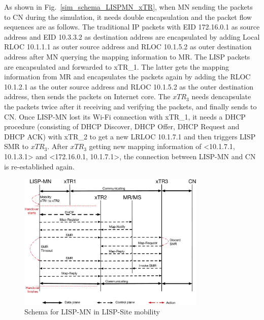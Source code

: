 As shown in Fig.~\ref{sim_schema_LISPMN_xTR}, when MN sending the packets to CN during the simulation, it needs double encapsulation and the packet flow sequences are as follows. The traditional IP packets with EID 172.16.0.1 as source address and EID 10.3.3.2 as destination address are encapsulated by adding Local RLOC 10.1.1.1 as outer source address and RLOC 10.1.5.2 as outer destination address after MN querying the mapping information to MR. The LISP packets are encapsulated and forwarded to xTR\_1. The latter gets the mapping information from MR and encapsulates the packets again by adding the RLOC 10.1.2.1 as the outer source address and RLOC 10.1.5.2 as the outer destination address, then sends the packets on Internet core. The $xTR_3$ needs dencapsulate the packets twice after it receiving and verifying the packets, and finally sends to CN. Once LISP-MN lost its Wi-Fi connection with xTR\_1, it needs a DHCP procedure (consisting of DHCP Discover, DHCP Offer, DHCP Request and DHCP ACK) with xTR\_2 to get a new LRLOC 10.1.7.1 and then triggers LISP SMR to $xTR_3$. After $xTR_3$ getting new mapping information of <10.1.7.1, 10.1.3.1> and <172.16.0.1, 10.1.7.1>, the connection between LISP-MN and CN is re-established again.
\begin{figure}[!th]
	\centering
	\includegraphics[width=0.8\textwidth]{Pics/Mobility_double_encap_schema_SMR_simplify}
	\caption{Schema for LISP-MN in LISP-Site mobility}
	\label{Mobility_double_encap_schema_SMR_simplify}
\end{figure}

